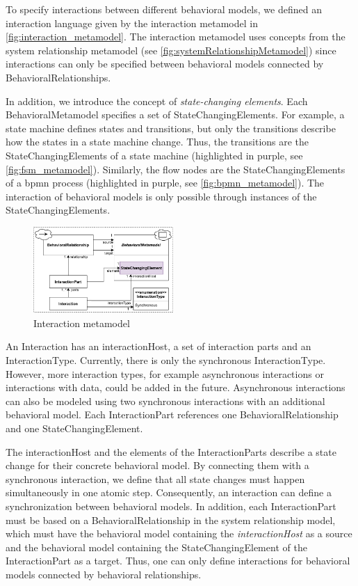 \documentclass{jot}
\begin{document}
To specify interactions between different behavioral models, we defined an interaction language given by the interaction metamodel in \autoref{fig:interaction_metamodel}.
The interaction metamodel uses concepts from the system relationship metamodel (see \autoref{fig:systemRelationshipMetamodel}) since interactions can only be specified between behavioral models connected by \textsf{BehavioralRelationship}s.

In addition, we introduce the concept of \emph{state-changing elements}.
Each \textsf{BehavioralMetamodel} specifies a set of \textsf{StateChangingElement}s.
For example, a state machine defines states and transitions, but only the transitions describe how the states in a state machine change.
Thus, the transitions are the \textsf{StateChangingElement}s of a state machine (highlighted in purple, see \autoref{fig:fsm_metamodel}).
Similarly, the flow nodes are the \textsf{StateChangingElement}s of a \gls*{bpmn} process (highlighted in purple, see \autoref{fig:bpmn_metamodel}).
The interaction of behavioral models is only possible through instances of the \textsf{StateChangingElement}s.

\begin{figure}[h]
    \centering
    \includegraphics[width=0.475\textwidth]{figures/interaction_metamodel.pdf}
    \caption{Interaction metamodel}
    \label{fig:interaction_metamodel}
\end{figure}

An \textsf{Interaction} has an \textsf{interactionHost}, a set of interaction \textsf{parts} and an \textsf{InteractionType}.
Currently, there is only the \textsf{synchronous} \textsf{InteractionType}.
However, more interaction types, for example asynchronous interactions or interactions with data, could be added in the future.
Asynchronous interactions can also be modeled using two synchronous interactions with an additional behavioral model.
Each \textsf{InteractionPart} references one \textsf{BehavioralRelationship} and one \textsf{StateChangingElement}.

The \textsf{interactionHost} and the elements of the \textsf{InteractionPart}s describe a state change for their concrete behavioral model.
By connecting them with a synchronous interaction, we define that all state changes must happen simultaneously in one atomic step. 
Consequently, an interaction can define a synchronization between behavioral models.
In addition, each \textsf{InteractionPart} must be based on a \textsf{BehavioralRelationship} in the system relationship model, which must have the behavioral model containing the \textit{interactionHost} as a source and the behavioral model containing the \textsf{StateChangingElement} of the \textsf{InteractionPart} as a target.
Thus, one can only define interactions for behavioral models connected by behavioral relationships.
\end{document}
